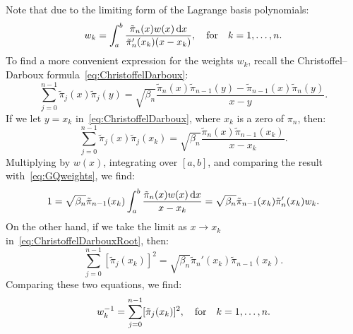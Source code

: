 \begin{remark}
Note that due to the limiting form of the Lagrange basis polynomials:
\begin{equation}\label{eq:GQweights}
w_k = \int_a^b \dfrac{\tilde{\pi}_n(x)w(x){\rm\,d} x}{\tilde{\pi}_n'(x_k)(x-x_k)},\quad{\rm for}\quad k=1,\ldots,n.
\end{equation}
To find a more convenient expression for the weights $w_k$, recall the Christoffel--Darboux formula~\eqref{eq:ChristoffelDarboux}:
\[
\sum_{j=0}^{n-1}\tilde{\pi}_j(x)\tilde{\pi}_j(y) = \sqrt{\beta_n}\dfrac{\tilde{\pi}_n(x)\tilde{\pi}_{n-1}(y) - \tilde{\pi}_{n-1}(x)\tilde{\pi}_n(y)}{x-y}.
\]
If we let $y=x_k$ in~\eqref{eq:ChristoffelDarboux}, where $x_k$ is a zero of $\pi_n$, then:
\begin{equation}\label{eq:ChristoffelDarbouxRoot}
\sum_{j=0}^{n-1}\tilde{\pi}_j(x)\tilde{\pi}_j(x_k) = \sqrt{\beta_n}\dfrac{\tilde{\pi}_n(x)\tilde{\pi}_{n-1}(x_k)}{x-x_k}.
\end{equation}
Multiplying by $w(x)$, integrating over $[a,b]$, and comparing the result with~\eqref{eq:GQweights}, we find:
\[
1 = \sqrt{\beta_n}\tilde{\pi}_{n-1}(x_k)\int_a^b\dfrac{\tilde{\pi}_n(x)w(x){\rm\,d} x}{x-x_k} = \sqrt{\beta_n}\tilde{\pi}_{n-1}(x_k)\tilde{\pi}_n'(x_k)w_k.
\]
On the other hand, if we take the limit as $x\to x_k$ in~\eqref{eq:ChristoffelDarbouxRoot}, then:
\begin{equation}\label{eq:ChristoffelDarbouxLimit}
\sum_{j=0}^{n-1}[\tilde{\pi}_j(x_k)]^2 = \sqrt{\beta_n}\tilde{\pi}_n'(x_k)\tilde{\pi}_{n-1}(x_k).
\end{equation}
Comparing these two equations, we find:
\begin{equation}\label{eq:GQweights2}
w_k^{-1} = \sum_{j=0}^{n-1}[\tilde{\pi}_j(x_k)]^2,\quad{\rm for}\quad k=1,\ldots,n.
\end{equation}
\end{remark}

